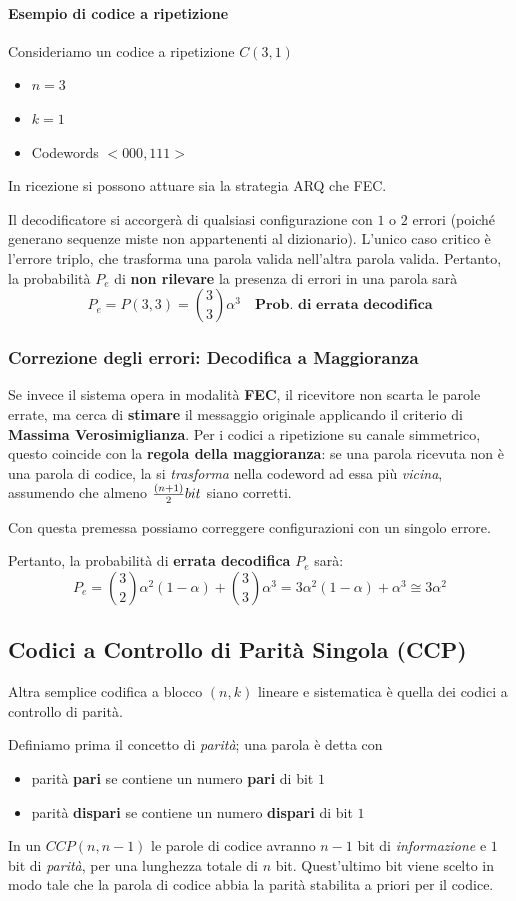 \paragraph{Esempio di codice a ripetizione}
Consideriamo un codice a ripetizione $C(3,1)$
\begin{itemize}
    \item $n=3$
    \item $k=1$
    \item Codewords $<000,111>$
\end{itemize}
In ricezione si possono attuare sia la strategia ARQ che FEC.

Il decodificatore si accorgerà di qualsiasi configurazione con $1$ o $2$ errori (poiché generano sequenze miste non appartenenti al dizionario). L'unico caso critico è l'errore triplo, che trasforma una parola valida nell'altra parola valida.
Pertanto, la probabilità $P_e$ di \textbf{non rilevare} la presenza di errori in una parola sarà
\[P_e=P(3,3)=\binom{3}{3}\alpha^3 \quad  \textbf{Prob. di errata decodifica}\]
\subsubsection{Correzione degli errori: Decodifica a Maggioranza}
Se invece il sistema opera in modalità \textbf{FEC}, il ricevitore non scarta le parole errate, ma cerca di \textbf{stimare} il messaggio originale applicando il criterio di \textbf{Massima Verosimiglianza}. Per i codici a ripetizione su canale simmetrico, questo coincide con la \textbf{regola della maggioranza}: se una parola ricevuta non è una parola di codice, la si \textit{trasforma} nella codeword ad essa più \textit{vicina}, assumendo che almeno $\frac{(n+1)}{2}\space bit$ siano corretti.

Con questa premessa possiamo correggere configurazioni con un singolo errore.

Pertanto, la probabilità di \textbf{errata decodifica} $P_e$ sarà:
\[P_e = \binom{3}{2}\alpha^2(1- \alpha) + \binom{3}{3}\alpha^3 = 3\alpha^2(1-\alpha) + \alpha^3 \cong 3\alpha^2\]


\subsection{Codici a Controllo di Parità Singola (CCP)}
Altra semplice codifica a blocco $(n,k)$ lineare e sistematica è quella dei codici a controllo di parità.

Definiamo prima il concetto di \textit{parità}; una parola è detta con
\begin{itemize}
    \item parità \textbf{pari} se contiene un numero \textbf{pari} di bit $1$
    \item parità \textbf{dispari} se contiene un numero \textbf{dispari} di bit $1$
\end{itemize}
In un $CCP(n,n-1)$ le parole di codice avranno $n-1$ bit di \textit{informazione} e $1$ bit di \textit{parità}, per una lunghezza totale di $n$ bit. Quest'ultimo bit viene scelto in modo tale che la parola di codice abbia la parità stabilita a priori per il codice.


